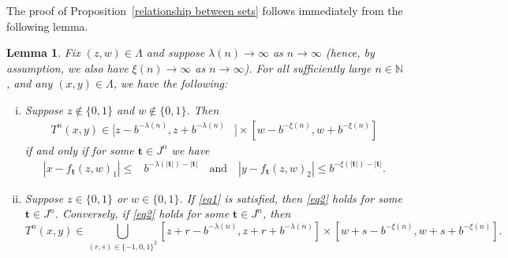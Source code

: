 \documentclass[12pt]{article}
\newtheorem{lemma}[definition]{Lemma}
\theoremstyle{remark}
\numberwithin{equation}{section}
\renewcommand{\Bbb}[1]{\mathbb{#1}}
\newcommand{\N}{{\Bbb N}}         %
\newcommand{\bt}{\mathbf{t}}
\newcommand{\0}{\mathbf{0}}
\begin{document}
{The proof of Proposition~\ref{relationship between sets} follows immediately from the following lemma.}
\begin{lemma} \label{Lemma 1}
Fix $(z,w) \in \Lambda$ and suppose $\lambda(n) { \to \infty}$ {as $n \to \infty$ (hence, by assumption, we also have $\xi(n) \to \infty$ as $n \to \infty$)}. For all sufficiently large $n \in \N$, and any $(x,y) \in \Lambda$, we have the following:
\begin{enumerate}[(i)]
\item \label{Lemma 1 i} Suppose $z \not \in \{0,1\}$ and $w \not \in \{0,1\}$. Then
\begin{align} 
T^{n}(x,y) \in [z-b^{-\lambda(n)},z+b^{-\lambda(n)}&]\times [w-b^{-\xi(n)}, w+b^{-\xi(n)}] \label{eq1} 
\end{align}
if and only if for some $\bt \in J^{n}$ we have
\begin{align} 
\left|x-f_{\bt}(z,w)_1\right|\leq &b^{-\lambda(|\bt|)-|\bt|} \quad \text{and} \quad \left|y-f_{\bt}(z,w)_2\right|\leq b^{-\xi(|\bt|)-|\bt|}. \label{eq2}
\end{align}
\item \label{Lemma 1 ii} Suppose $z \in \{0,1\}$ or $w \in \{0,1\}$. If \eqref{eq1} is satisfied,
then \eqref{eq2} holds for some $\bt \in J^{n}$.
Conversely, if \eqref{eq2} holds for some $\bt \in J^{n}$, then
\begin{equation}
T^{n}(x,y) \in \bigcup_{(r,s)\in\{-1,0,1\}^2} [z+r-b^{-\lambda(n)},z+r+b^{-\lambda(n)}]\times [w+s-b^{-\xi(n)}, w+s+b^{-\xi(n)}]. \label{eq6}
\end{equation}
\end{enumerate}
\end{lemma}
\end{document}
